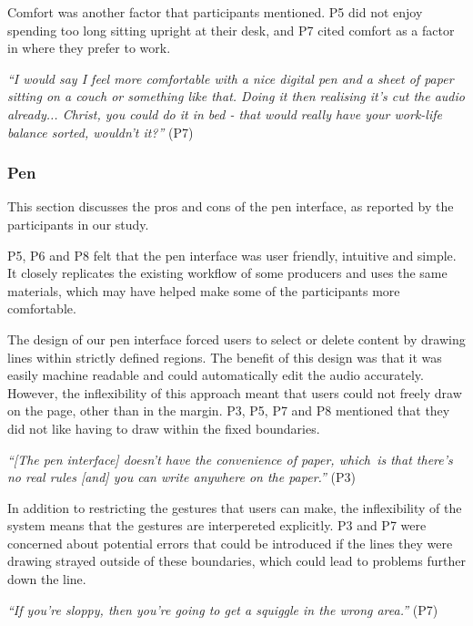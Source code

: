 Comfort was another factor that participants mentioned. P5 did not enjoy spending too long sitting upright at their
desk, and P7 cited comfort as a factor in where they prefer to work.

\textit{``I would say I feel more comfortable with a nice digital pen and a sheet of paper sitting on a couch or
something like that. Doing it then realising it's cut the audio already... Christ, you could do it in bed - that would
really have your work-life balance sorted, wouldn't it?''} (P7)

\subsubsection{Pen}

This section discusses the pros and cons of the pen interface, as reported by the participants in our study.


P5, P6 and P8 felt that the pen interface was user friendly, intuitive and simple. It closely replicates the existing
workflow of some producers and uses the same materials, which may have helped make some of the participants more
comfortable.


The design of our pen interface forced users to select or delete content by drawing lines within strictly defined
regions. The benefit of this design was that it was easily machine readable and could automatically edit the audio
accurately. However, the inflexibility of this approach meant that users could not freely draw on the page, other than
in the margin. P3, P5, P7 and P8 mentioned that they did not like having to draw within the fixed boundaries.

\textit{``[The pen interface] doesn't have the convenience of paper, which is that there's no real rules [and] you can
write anywhere on the paper.''} (P3)

In addition to restricting the gestures that users can make, the inflexibility of the system means that the gestures
are interpereted explicitly. P3 and P7 were concerned about potential errors that could be introduced if the lines they
were drawing strayed outside of these boundaries, which could lead to problems further down the line.

\textit{``If you're sloppy, then you're going to get a squiggle in the wrong area.''} (P7)


